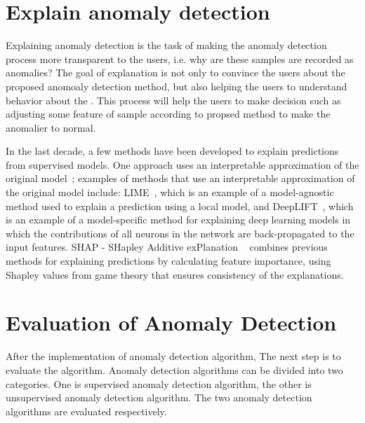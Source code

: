 \section{Explain anomaly detection}
\label{sec-explain_anomaly}
Explaining anomaly detection is the task of making
the anomaly detection process more transparent to the users,
i.e. why are these samples are recorded as anomalies?
The  goal of explanation is not only to
convince the users about the proposed anomoaly detection method,
but also helping the users to understand behavior about
the .
This process will help the users to make decision such as
adjusting some feature of sample according to propsed method to
make the anomalier to normal.

In the last decade,
a few methods have been developed to explain predictions
from supervised models.
One approach uses an interpretable approximation of
the original model~\cite{lundberg2017unified};
examples of methods that
use an interpretable approximation
of the original model include: LIME~\cite{ribeiro2016should},
which is an example of a
model-agnostic method used to
explain a prediction using a local model,
and DeepLIFT~\cite{shrikumar2017learning},
which is an example of a model-specific method for explaining
deep learning models in which
the contributions of all neurons in the network are
back-propagated to the input features.
SHAP - SHapley Additive exPlanation ~\cite{lundberg2017unified}
combines previous methods for
explaining predictions by calculating feature
importance,
using Shapley values from
game theory that ensures consistency of
the explanations.




\section{Evaluation of Anomaly Detection}

After the implementation of anomaly detection algorithm,
The next step is to evaluate the algorithm. 
Anomaly detection algorithms can be divided into two categories. 
One is supervised anomaly detection algorithm, 
the other is unsupervised anomaly detection algorithm.
The two anomaly detection algorithms are evaluated respectively.

